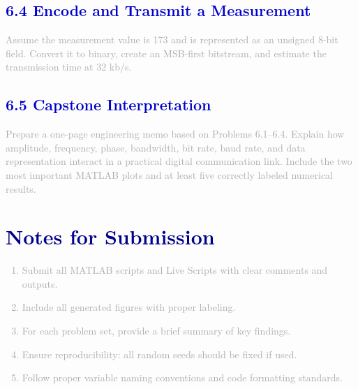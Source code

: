 \documentclass[12pt,a4paper]{article}
\begin{document}
\subsection*{\large\textbf{\textcolor{mediumblue}{6.4 Encode and Transmit a Measurement}}}

\textcolor{darkgray}{
Assume the measurement value is 173 and is represented as an unsigned 8-bit field. Convert it to binary, create an MSB-first bitstream, and estimate the transmission time at 32 kb/s.
}

\subsection*{\large\textbf{\textcolor{mediumblue}{6.5 Capstone Interpretation}}}

\textcolor{darkgray}{
Prepare a one-page engineering memo based on Problems 6.1--6.4. Explain how amplitude, frequency, phase, bandwidth, bit rate, baud rate, and data representation interact in a practical digital communication link. Include the two most important MATLAB plots and at least five correctly labeled numerical results.
}

\newpage

\section*{\textbf{\textcolor{darkblue}{Notes for Submission}}}

\textcolor{darkgray}{
\begin{enumerate}
    \item Submit all MATLAB scripts and Live Scripts with clear comments and outputs.
    \item Include all generated figures with proper labeling.
    \item For each problem set, provide a brief summary of key findings.
    \item Ensure reproducibility: all random seeds should be fixed if used.
    \item Follow proper variable naming conventions and code formatting standards.
\end{enumerate}
}
\end{document}
